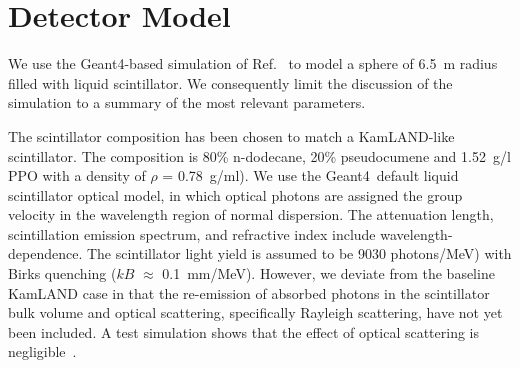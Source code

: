 \section{Detector Model}
\label{sec:detector_description}


We use the Geant4-based simulation of Ref.~\cite{Aberle2014}
to model a sphere of 6.5~m radius filled with liquid scintillator. We
consequently limit the discussion of the simulation to a summary of
the most relevant parameters.

The scintillator composition has been chosen to match a KamLAND-like
scintillator\cite{kamland2003}. The composition is 80\% n-dodecane,
20\% pseudocumene and 1.52~g/l PPO with a density of $\rho$ =
0.78~g/ml).  We use the Geant4~default liquid scintillator optical
model, in which optical photons are assigned the group velocity in the
wavelength region of normal dispersion. The attenuation
length\cite{tajimaMaster}, scintillation emission
spectrum\cite{tajimaMaster}, and refractive index\cite{OlegThesis}
include wavelength-dependence. The scintillator light yield is assumed
to be 9030 photons/MeV) with Birks quenching ($kB$ $\approx$
0.1~mm/MeV)\cite{ChrisThesis}. However, we deviate from the
baseline KamLAND case in that the re-emission of absorbed photons in
the scintillator bulk volume and optical scattering, specifically
Rayleigh scattering, have not yet been included. A test simulation
shows that the effect of optical scattering is
negligible~\cite{Aberle2014}.


